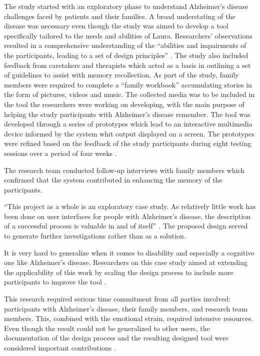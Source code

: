 The study started with an exploratory phase to understand Alzheimer’s disease challenges faced by patients and their families. A broad understating of the disease was necessary even though the study was aimed to develop a tool specifically tailored to the needs and abilities of Laura.  Researchers’ observations resulted in a comprehensive understanding of the ``abilities and impairments of the participants, leading to a set of design principles'' \parencite{Cohene2007}. The study also included feedback from caretakers and therapists which acted as a basis in outlining a set of guidelines to assist with memory recollection. As part of the study, family members were required to complete a ``family workbook'' accumulating stories in the form of pictures, videos and music.  The collected media was to be included in the tool the researchers were working on developing, with the main purpose of helping the study participants with Alzheimer’s disease remember.   
The tool was developed through a series of prototypes which lead to an interactive multimedia device informed by the system whit output displayed on a screen.  The prototypes were refined based on the feedback of the study participants during eight testing sessions over a period of four weeks \parencite{Cohene2007}. 

The research team conducted follow-up interviews with family members which confirmed that the system contributed in enhancing the memory of the participants. 

``This project as a whole is an exploratory case study. As relatively little work has been done on user interfaces for people with Alzheimer’s disease, the description of a successful process is valuable in and of itself'' \parencite{Cohene2007}. The proposed design served to generate further investigations rather than as a solution.

It is very hard to generalize when it comes to disability and especially a cognitive one like Alzheimer’s disease. Researchers on this case study aimed at extending the applicability of this work by scaling the design process to include more participants to improve the tool \parencite{Cohene2007}.

This research required serious time commitment from all parties involved: participants with Alzheimer’s disease, their family members, and research team members. This, combined with the emotional strain, required intensive resources.  Even though the result could not be generalized to other users, the documentation of the design process and the resulting designed tool were considered important contributions \parencite{Cohene2007}.

